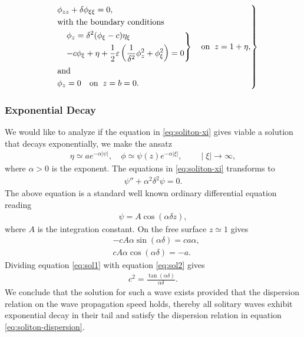 \begin{align}\label{eq:soliton-xi}
    \begin{drcases}
   & \phi_{zz} + \delta \phi_{\xi\xi}  = 0,\\
   &\text{with the boundary conditions}\\
   &\begin{drcases}
    &\phi_z = \delta^2 (\phi_\xi -c)\eta_\xi \\
    &-c\phi_\xi + \eta +  \frac{1}{2}\varepsilon\left( \frac{1}{\delta^2}\phi^2_z
    + \phi_\xi^2\right)  =0
  \end{drcases}\quad \text{on}\;\; z = 1+\eta,\\
   &\text{and}\\
   & \phi_z =0 \quad \text{on}\;\; z = b = 0.
    \end{drcases}
\end{align}
\subsubsection{Exponential Decay}
We would like to analyze if the equation in \ref{eq:soliton-xi} gives viable a
solution that decays exponentially, we make the ansatz
\begin{align}
    \eta \simeq a e^{-\alpha |\psi|},\quad \phi \simeq \psi(z)e^{-\alpha
    |\xi|}, \qquad  \mid \xi \mid \rightarrow \infty,
\end{align}
where $\alpha>0$ is the exponent. The equations in \ref{eq:soliton-xi}
transforms to
\begin{align}
    \psi'' + \alpha^2 \delta^2\psi = 0.
\end{align}
The above equation is a standard well known ordinary differential equation
reading
\begin{align}
    \psi = A \cos(\alpha\delta z),
\end{align}
where $A$ is the integration constant. On the free surface $z\simeq 1$ gives
\begin{align}
    &-cA\alpha\sin(\alpha\delta) = ca\alpha,\label{eq:sol1}\\
    &cA\alpha \cos(\alpha\delta) = -a \label{eq:sol2}.
\end{align}
Dividing equation \ref{eq:sol1} with equation \ref{eq:sol2} gives
\begin{align} \label{eq:soliton-dispersion}
    c^2 = \frac{\tan\left(\alpha\delta  \right) }{\alpha\delta}.
\end{align}
We conclude that the solution for such a wave exists provided that the
dispersion relation on the wave propagation speed holds, thereby all solitary
waves exhibit exponential decay in their tail and satisfy the dispersion
relation in equation \ref{eq:soliton-dispersion}.
